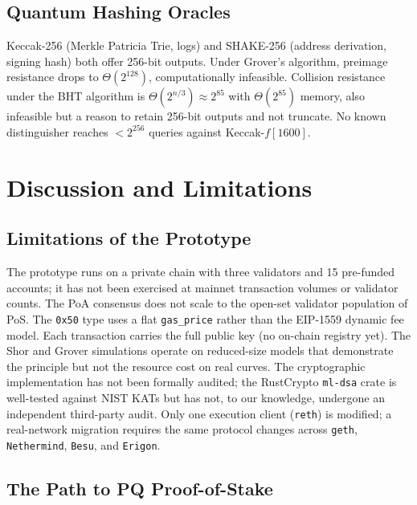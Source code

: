 \documentclass[journal,onecolumn,11pt]{IEEEtran}
\begin{document}
\subsection{Quantum Hashing Oracles} Keccak-256 (Merkle Patricia Trie, logs) and SHAKE-256 (address derivation, signing hash) both offer 256-bit outputs. Under Grover's algorithm, preimage resistance drops to $\Theta(2^{128})$, computationally infeasible. Collision resistance under the BHT algorithm is $\Theta(2^{n/3}) \approx 2^{85}$ with $\Theta(2^{85})$ memory, also infeasible but a reason to retain 256-bit outputs and not truncate. No known distinguisher reaches $< 2^{256}$ queries against Keccak-$f[1600]$.

\section{Discussion and Limitations}
\label{sec:discussion}

\subsection{Limitations of the Prototype}

The prototype runs on a private chain with three validators and 15 pre-funded accounts; it has not been exercised at mainnet transaction volumes or validator counts. The PoA consensus does not scale to the open-set validator population of PoS. The \texttt{0x50} type uses a flat \texttt{gas\_price} rather than the EIP-1559 dynamic fee model. Each transaction carries the full public key (no on-chain registry yet). The Shor and Grover simulations operate on reduced-size models that demonstrate the principle but not the resource cost on real curves. The cryptographic implementation has not been formally audited; the RustCrypto \texttt{ml-dsa} crate is well-tested against NIST KATs but has not, to our knowledge, undergone an independent third-party audit. Only one execution client (\texttt{reth}) is modified; a real-network migration requires the same protocol changes across \texttt{geth}, \texttt{Nethermind}, \texttt{Besu}, and \texttt{Erigon}.

\subsection{The Path to PQ Proof-of-Stake}
\end{document}
